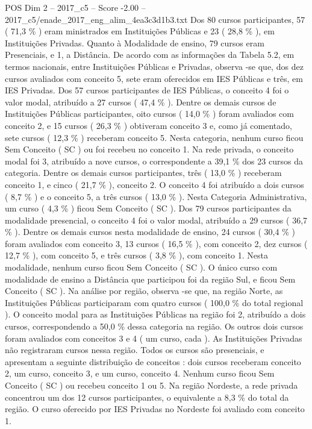 \begin{textsample}{POS Dim 2 – 2017\_c5 – Score -2.00 – 2017\_c5/enade\_2017\_eng\_alim\_4ea3c3d1b3.txt}
Dos 80 cursos participantes, 57 ( 71,3 \% ) eram ministrados em Instituições Públicas e 23 ( 28,8 \% ), em Instituições Privadas.
Quanto à Modalidade de ensino, 79 cursos eram Presenciais, e 1, a Distância.
De acordo com as informações da Tabela 5.2, em termos nacionais, entre Instituições Públicas e Privadas, observa -se que, dos dez cursos avaliados com conceito 5, sete eram oferecidos em IES Públicas e três, em IES Privadas.
Dos 57 cursos participantes de IES Públicas, o conceito 4 foi o valor modal, atribuído a 27 cursos ( 47,4 \% ).
Dentre os demais cursos de Instituições Públicas participantes, oito cursos ( 14,0 \% ) foram avaliados com conceito 2, e 15 cursos ( 26,3 \% ) obtiveram conceito 3 e, como já comentado, sete cursos ( 12,3 \% ) receberam conceito 5.
Nesta categoria, nenhum curso ficou Sem Conceito ( SC ) ou foi recebeu no conceito 1.
Na rede privada, o conceito modal foi 3, atribuído a nove cursos, o correspondente a 39,1 \% dos 23 cursos da categoria.
Dentre os demais cursos participantes, três ( 13,0 \% ) receberam conceito 1, e cinco ( 21,7 \% ), conceito 2.
O conceito 4 foi atribuído a dois cursos ( 8,7 \% ) e o conceito 5, a três cursos ( 13,0 \% ).
Nesta Categoria Administrativa, um curso ( 4,3 \% ) ficou Sem Conceito ( SC ).
Dos 79 cursos participantes da modalidade presencial, o conceito 4 foi o valor modal, atribuído a 29 cursos ( 36,7 \% ).
Dentre os demais cursos nesta modalidade de ensino, 24 cursos ( 30,4 \% ) foram avaliados com conceito 3, 13 cursos ( 16,5 \% ), com conceito 2, dez cursos ( 12,7 \% ), com conceito 5, e três cursos ( 3,8 \% ), com conceito 1.
Nesta modalidade, nenhum curso ficou Sem Conceito ( SC ).
O único curso com modalidade de ensino a Distância que participou foi da região Sul, e ficou Sem Conceito ( SC ).
Na análise por região, observa -se que, na região Norte, as Instituições Públicas participaram com quatro cursos ( 100,0 \% do total regional ).
O conceito modal para as Instituições Públicas na região foi 2, atribuído a dois cursos, correspondendo a 50,0 \% dessa categoria na região.
Os outros dois cursos foram avaliados com conceitos 3 e 4 ( um curso, cada ).
As Instituições Privadas não registraram cursos nessa região.
Todos os cursos são presenciais, e apresentam a seguinte distribuição de conceitos : dois cursos receberam conceito 2, um curso, conceito 3, e um curso, conceito 4.
Nenhum curso ficou Sem Conceito ( SC ) ou recebeu conceito 1 ou 5.
Na região Nordeste, a rede privada concentrou um dos 12 cursos participantes, o equivalente a 8,3 \% do total da região.
O curso oferecido por IES Privadas no Nordeste foi avaliado com conceito 1.

\end{textsample}
